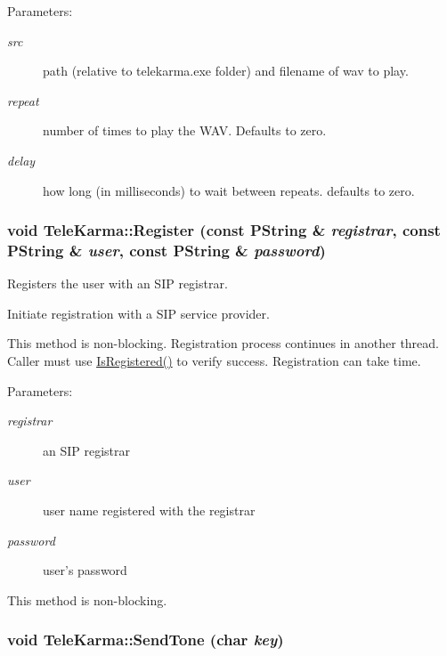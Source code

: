 \begin{Desc}
\item[Parameters:]
\begin{description}
\item[{\em src}]path (relative to telekarma.exe folder) and filename of wav to play. \item[{\em repeat}]number of times to play the WAV. Defaults to zero. \item[{\em delay}]how long (in milliseconds) to wait between repeats. defaults to zero.\end{description}
\end{Desc}
\hypertarget{classTeleKarma_94c53557510b5373b400128ded8cb7a6}{
\subsubsection[{Register}]{\setlength{\rightskip}{0pt plus 5cm}void TeleKarma::Register (const PString \& {\em registrar}, \/  const PString \& {\em user}, \/  const PString \& {\em password})}}
\label{classTeleKarma_94c53557510b5373b400128ded8cb7a6}


Registers the user with an SIP registrar. 

Initiate registration with a SIP service provider.

This method is non-blocking. Registration process continues in another thread. Caller must use \hyperlink{classTeleKarma_ac8cc89975dcba9feefeb0f79684836e}{IsRegistered()} to verify success. Registration can take time. \begin{Desc}
\item[Parameters:]
\begin{description}
\item[{\em registrar}]an SIP registrar \item[{\em user}]user name registered with the registrar \item[{\em password}]user's password\end{description}
\end{Desc}
This method is non-blocking. \hypertarget{classTeleKarma_85b9f9bf83876f3fa9cc326a7124f6d5}{
\subsubsection[{SendTone}]{\setlength{\rightskip}{0pt plus 5cm}void TeleKarma::SendTone (char {\em key})}}
\label{classTeleKarma_85b9f9bf83876f3fa9cc326a7124f6d5}


